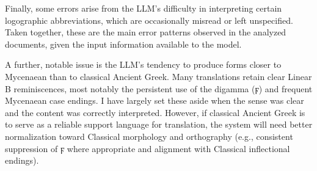 Finally, some errors arise from the LLM's difficulty in interpreting certain logographic abbreviations, which are occasionally misread or left unspecified.
Taken together, these are the main error patterns observed in the analyzed documents, given the input information available to the model.

A further, notable issue is the LLM's tendency to produce forms closer to Mycenaean than to classical Ancient Greek.
Many translations retain clear Linear B reminiscences, most notably the persistent use of the digamma (\textgreek{ϝ}) and frequent Mycenaean case endings.
I have largely set these aside when the sense was clear and the content was correctly interpreted.
However, if classical Ancient Greek is to serve as a reliable support language for translation, the system will need better normalization toward Classical morphology and orthography (e.g., consistent suppression of \textgreek{ϝ} where appropriate and alignment with Classical inflectional endings).